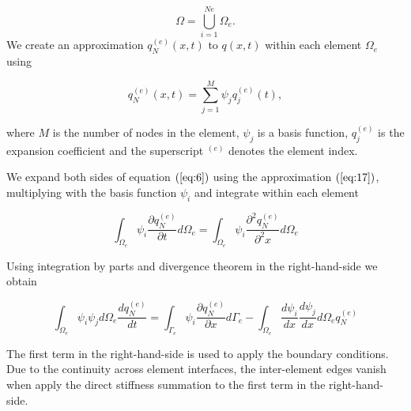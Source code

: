 \documentclass[11pt,a4paper]{article}
\begin{document}
	$$\Omega = \bigcup_{i=1}^{Ne}\Omega_e.$$
	We create an approximation $q_N^{(e)}(x,t)$ to $q(x,t)$ within each element $\Omega_e$ using 
	
	\begin{equation}
	\label{eq:17}
	    q_N^{(e)}(x,t) = \sum_{j=1}^{M} \psi_jq_j^{(e)}(t),
	\end{equation}
	
	where $M$ is the number of nodes in the element, $\psi_j$ is a basis function, $q_j^{(e)}$ is the expansion coefficient and the superscript $^{(e)}$ denotes the element index.
	
	We expand both sides of equation $(\ref{eq:6})$ using the approximation $(\ref{eq:17})$, multiplying with the basis function $\psi_i$ and integrate within each element 
	
	\begin{equation}
	    \int_{\Omega_e}\psi_i\dfrac{\partial q_N^{(e)}}{\partial t}d{\Omega_e} = \int_{\Omega_e}\psi_i\dfrac{\partial^2 q_N^{(e)}}{\partial^2 x}d{\Omega_e}
	\end{equation}
	
	Using integration by parts and divergence theorem in the right-hand-side we obtain
	
	\begin{equation}
	    \int_{\Omega_e}\psi_i\psi_jd{\Omega_e}\dfrac{d q_N^{(e)}}{dt} = \int_{\Gamma_e}\psi_i\dfrac{\partial q_N^{(e)}}{\partial x}d{\Gamma_e} - \int_{\Omega_e}\dfrac{d\psi_i}{dx}\dfrac{d\psi_j}{d x}d{\Omega_e}q_N^{(e)}
	    \label{eq:20}
	\end{equation}
	
	The first term in the right-hand-side is used to apply the boundary conditions. Due to the continuity across element interfaces, the inter-element edges vanish when apply the direct stiffness summation to the first term in the right-hand-side.
	
\end{document}
